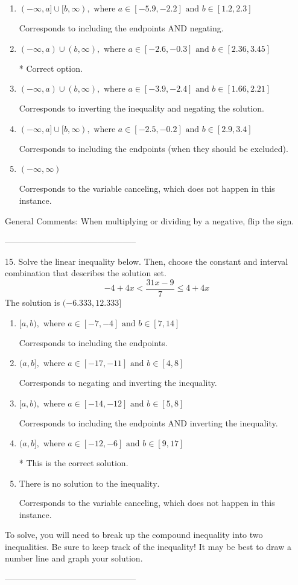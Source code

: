\documentclass{article}[10pt]
\begin{document}
\begin{enumerate}[label=\Alph*.] 
\item $ (-\infty, a] \cup [b, \infty), \text{ where } a \in [-5.9, -2.2] \text{ and } b \in [1.2, 2.3] $ 

 Corresponds to including the endpoints AND negating. 
\item $ (-\infty, a) \cup (b, \infty), \text{ where } a \in [-2.6, -0.3] \text{ and } b \in [2.36, 3.45] $ 

  * Correct option. 
\item $ (-\infty, a) \cup (b, \infty), \text{ where } a \in [-3.9, -2.4] \text{ and } b \in [1.66, 2.21] $ 

 Corresponds to inverting the inequality and negating the solution. 
\item $ (-\infty, a] \cup [b, \infty), \text{ where } a \in [-2.5, -0.2] \text{ and } b \in [2.9, 3.4] $ 

 Corresponds to including the endpoints (when they should be excluded). 
\item $ (-\infty, \infty) $ 

 Corresponds to the variable canceling, which does not happen in this instance. 
\end{enumerate} 
 
General Comments: When multiplying or dividing by a negative, flip the sign.

-----------------------------------------------

15. Solve the linear inequality below. Then, choose the constant and interval combination that describes the solution set.
$$ -4 + 4 x < \frac{31 x - 9}{7} \leq 4 + 4 x $$ 
The solution is $ (-6.333, 12.333] $ 

\begin{enumerate}[label=\Alph*.] 
\item $ [a, b), \text{ where } a \in [-7, -4] \text{ and } b \in [7, 14] $ 

 Corresponds to including the endpoints. 
\item $ (a, b], \text{ where } a \in [-17, -11] \text{ and } b \in [4, 8] $ 

 Corresponds to negating and inverting the inequality. 
\item $ [a, b), \text{ where } a \in [-14, -12] \text{ and } b \in [5, 8] $ 

 Corresponds to including the endpoints AND inverting the inequality. 
\item $ (a, b], \text{ where } a \in [-12, -6] \text{ and } b \in [9, 17] $ 

  * This is the correct solution. 
\item $ \text{There is no solution to the inequality.} $ 

 Corresponds to the variable canceling, which does not happen in this instance. 
\end{enumerate} 
 
To solve, you will need to break up the compound inequality into two inequalities. Be sure to keep track of the inequality! It may be best to draw a number line and graph your solution.

-----------------------------------------------
\end{document}
